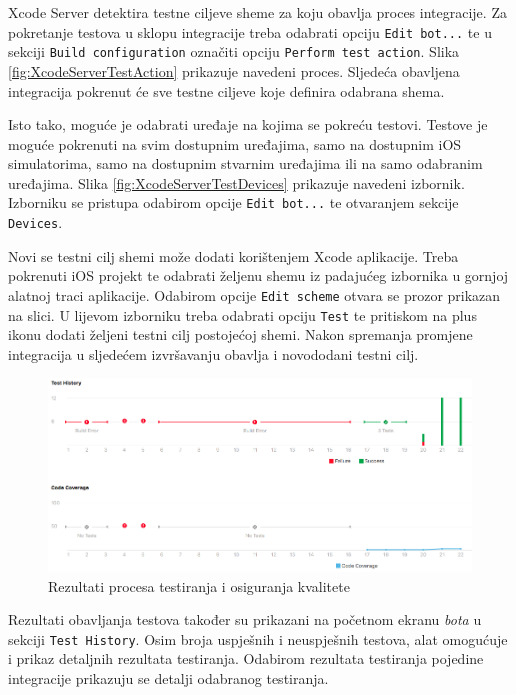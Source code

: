 \documentclass[times, utf8, diplomski, numeric]{fer}
\begin{document}
Xcode Server detektira testne ciljeve sheme za koju obavlja proces integracije. Za pokretanje testova u sklopu integracije treba odabrati opciju \verb|Edit bot...| te u sekciji \verb|Build configuration| označiti opciju \verb|Perform test action|. Slika \ref{fig:XcodeServerTestAction} prikazuje navedeni proces. Sljedeća obavljena integracija pokrenut će sve testne ciljeve koje definira odabrana shema.

Isto tako, moguće je odabrati uređaje na kojima se pokreću testovi. Testove je moguće pokrenuti na svim dostupnim uređajima, samo na dostupnim iOS simulatorima, samo na dostupnim stvarnim uređajima ili na samo odabranim uređajima. Slika \ref{fig:XcodeServerTestDevices} prikazuje navedeni izbornik. Izborniku se pristupa odabirom opcije \verb|Edit bot...| te otvaranjem sekcije \verb|Devices|.

Novi se testni cilj shemi može dodati korištenjem Xcode aplikacije. Treba pokrenuti iOS projekt te odabrati željenu shemu iz padajućeg izbornika u gornjoj alatnoj traci aplikacije. Odabirom opcije \verb|Edit scheme| otvara se prozor prikazan na slici. U lijevom izborniku treba odabrati opciju \verb|Test| te pritiskom na plus ikonu dodati željeni testni cilj postojećoj shemi. Nakon spremanja promjene integracija u sljedećem izvršavanju obavlja i novododani testni cilj.

\begin{figure}[b!]
\centering
\includegraphics[scale=0.4]{XcodeServerTestResult}
\caption{Rezultati procesa testiranja i osiguranja kvalitete}
\label{fig:XcodeServerTestResult}
\end{figure}

Rezultati obavljanja testova također su prikazani na početnom ekranu \textit{bota} u sekciji \verb|Test History|. Osim broja uspješnih i neuspješnih testova, alat omogućuje i prikaz detaljnih rezultata testiranja. Odabirom rezultata testiranja pojedine integracije prikazuju se detalji odabranog testiranja.
\end{document}
